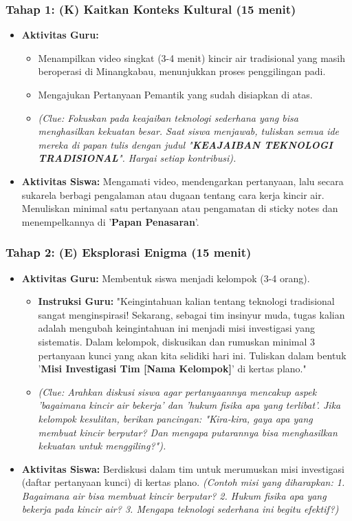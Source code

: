 \documentclass[a4paper,12pt]{article}
\begin{document}
\subsubsection{Tahap 1: (K) Kaitkan Konteks Kultural (15 menit)}
\begin{itemize}
\item \textbf{Aktivitas Guru:}
    \begin{itemize}
    \item Menampilkan video singkat (3-4 menit) kincir air tradisional yang masih beroperasi di Minangkabau, menunjukkan proses penggilingan padi.
    \item Mengajukan Pertanyaan Pemantik yang sudah disiapkan di atas.
    \item \textit{(Clue: Fokuskan pada keajaiban teknologi sederhana yang bisa menghasilkan kekuatan besar. Saat siswa menjawab, tuliskan semua ide mereka di papan tulis dengan judul "\textbf{KEAJAIBAN TEKNOLOGI TRADISIONAL}". Hargai setiap kontribusi).}
    \end{itemize}
\item \textbf{Aktivitas Siswa:} Mengamati video, mendengarkan pertanyaan, lalu secara sukarela berbagi pengalaman atau dugaan tentang cara kerja kincir air. Menuliskan minimal satu pertanyaan atau pengamatan di sticky notes dan menempelkannya di '\textbf{Papan Penasaran}'.
\end{itemize}

\subsubsection{Tahap 2: (E) Eksplorasi Enigma (15 menit)}
\begin{itemize}
\item \textbf{Aktivitas Guru:} Membentuk siswa menjadi kelompok (3-4 orang).
    \begin{itemize}
    \item \textbf{Instruksi Guru:} "Keingintahuan kalian tentang teknologi tradisional sangat menginspirasi! Sekarang, sebagai tim insinyur muda, tugas kalian adalah mengubah keingintahuan ini menjadi misi investigasi yang sistematis. Dalam kelompok, diskusikan dan rumuskan minimal 3 pertanyaan kunci yang akan kita selidiki hari ini. Tuliskan dalam bentuk '\textbf{Misi Investigasi Tim [Nama Kelompok]}' di kertas plano."
    \item \textit{(Clue: Arahkan diskusi siswa agar pertanyaannya mencakup aspek 'bagaimana kincir air bekerja' dan 'hukum fisika apa yang terlibat'. Jika kelompok kesulitan, berikan pancingan: "Kira-kira, gaya apa yang membuat kincir berputar? Dan mengapa putarannya bisa menghasilkan kekuatan untuk menggiling?").}
    \end{itemize}
\item \textbf{Aktivitas Siswa:} Berdiskusi dalam tim untuk merumuskan misi investigasi (daftar pertanyaan kunci) di kertas plano. \textit{(Contoh misi yang diharapkan: 1. Bagaimana air bisa membuat kincir berputar? 2. Hukum fisika apa yang bekerja pada kincir air? 3. Mengapa teknologi sederhana ini begitu efektif?)}
\end{itemize}
\end{document}
